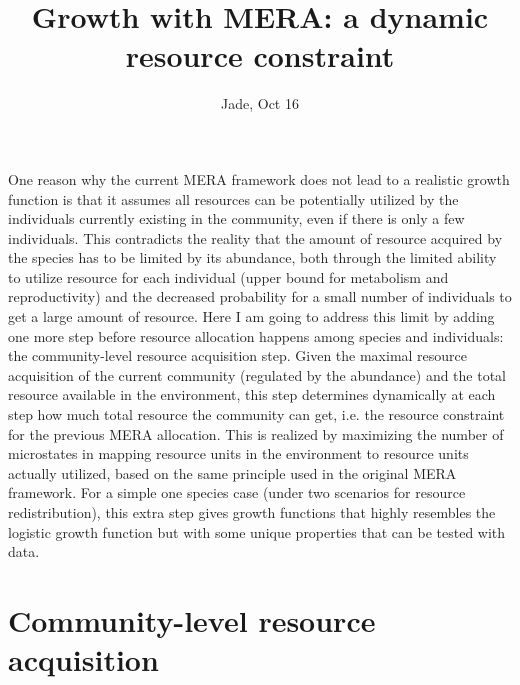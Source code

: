 \documentclass[12pt]{article}
\date{}
\title{\Large \textbf{Growth with MERA: a dynamic resource constraint}}
\author{Jade, Oct 16}
\begin{document}
\maketitle
\raggedright
\large
\setlength{\parindent}{15pt}

One reason why the current MERA framework does not lead to a realistic growth function is that it assumes all resources can be potentially utilized by the individuals currently existing in the community, even if there is only a few individuals. This contradicts the reality that the amount of resource acquired by the species has to be limited by its abundance, both through the limited ability to utilize resource for each individual (upper bound for metabolism and reproductivity) and the decreased probability for a small number of individuals to get a large amount of resource. Here I am going to address this limit by adding one more step before resource allocation happens among species and individuals: the community-level resource acquisition step. Given the maximal resource acquisition of the current community (regulated by the abundance) and the total resource available in the environment, this step determines dynamically at each step how much total resource the community can get, i.e. the resource constraint for the previous MERA allocation. This is realized by maximizing the number of microstates in mapping resource units in the environment to resource units actually utilized, based on the same principle used in the original MERA framework. For a simple one species case (under two scenarios for resource redistribution), this extra step gives growth functions that highly resembles the logistic growth function but with some unique properties that can be tested with data.

\section{Community-level resource acquisition}
\end{document}
